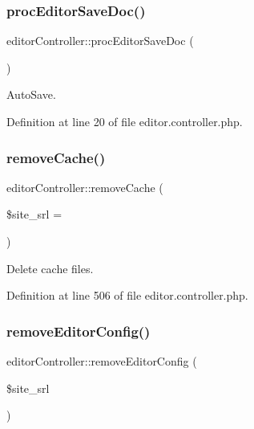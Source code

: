 \subsubsection{\texorpdfstring{proc\+Editor\+Save\+Doc()}{procEditorSaveDoc()}}
{\footnotesize\ttfamily editor\+Controller\+::proc\+Editor\+Save\+Doc (\begin{DoxyParamCaption}{ }\end{DoxyParamCaption})}



Auto\+Save. 



Definition at line 20 of file editor.\+controller.\+php.

\mbox{\label{classeditorController_a0a512fff61d647692ad254eacafb8f0b}} 
\subsubsection{\texorpdfstring{remove\+Cache()}{removeCache()}}
{\footnotesize\ttfamily editor\+Controller\+::remove\+Cache (\begin{DoxyParamCaption}\item[{}]{\$site\+\_\+srl = {} }\end{DoxyParamCaption})}



Delete cache files. 



Definition at line 506 of file editor.\+controller.\+php.

\mbox{\label{classeditorController_a0c27d19482d9ad6c9de0e42ad7ad6465}} 
\subsubsection{\texorpdfstring{remove\+Editor\+Config()}{removeEditorConfig()}}
{\footnotesize\ttfamily editor\+Controller\+::remove\+Editor\+Config (\begin{DoxyParamCaption}\item[{}]{\$site\+\_\+srl }\end{DoxyParamCaption})}



